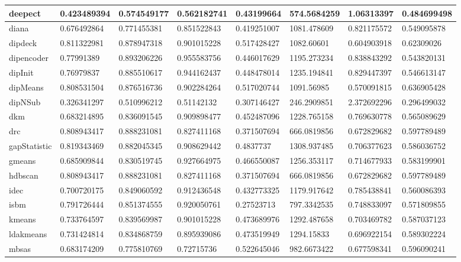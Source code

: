 \begin{table}[H]
\begin{tabular}{|l|l|l|l|l|l|l|l|}
\hline
deepect & 0.423489394 & 0.574549177 & 0.562182741 & 0.43199664 & 574.5684259 & 1.06313397 & 0.484699498 \\
\hline
diana & 0.676492864 & 0.771455381 & 0.851522843 & 0.419251007 & 1081.478609 & 0.821175572 & 0.549095878 \\
\hline
dipdeck & 0.811322981 & 0.878947318 & 0.901015228 & 0.517428427 & 1082.60601 & 0.604903918 & 0.62309026 \\
\hline
dipencoder & 0.77991389 & 0.893206226 & 0.955583756 & 0.446017629 & 1195.273234 & 0.838843292 & 0.543820131 \\
\hline
dipInit & 0.76979837 & 0.885510617 & 0.944162437 & 0.448478014 & 1235.194841 & 0.829447397 & 0.546613147 \\
\hline
dipMeans & 0.808531504 & 0.876516736 & 0.902284264 & 0.517020744 & 1091.56985 & 0.570091815 & 0.636905428 \\
\hline
dipNSub & 0.326341297 & 0.510996212 & 0.51142132 & 0.307146427 & 246.2909851 & 2.372692296 & 0.296499032 \\
\hline
dkm & 0.683214895 & 0.836091545 & 0.909898477 & 0.452487096 & 1228.765158 & 0.769630778 & 0.565089629 \\
\hline
drc & 0.808943417 & 0.888231081 & 0.827411168 & 0.371507694 & 666.0819856 & 0.672829682 & 0.597789489 \\
\hline
gapStatistic & 0.819343469 & 0.882045345 & 0.908629442 & 0.4837737 & 1308.937485 & 0.706377623 & 0.586036752 \\
\hline
gmeans & 0.685909844 & 0.830519745 & 0.927664975 & 0.466550087 & 1256.353117 & 0.714677933 & 0.583199901 \\
\hline
hdbscan & 0.808943417 & 0.888231081 & 0.827411168 & 0.371507694 & 666.0819856 & 0.672829682 & 0.597789489 \\
\hline
idec & 0.700720175 & 0.849060592 & 0.912436548 & 0.432773325 & 1179.917642 & 0.785438841 & 0.560086393 \\
\hline
isbm & 0.791726444 & 0.851374555 & 0.920050761 & 0.27523713 & 797.3342535 & 0.748833097 & 0.571809855 \\
\hline
kmeans & 0.733764597 & 0.839569987 & 0.901015228 & 0.473689976 & 1292.487658 & 0.703469782 & 0.587037123 \\
\hline
ldakmeans & 0.731424814 & 0.834868759 & 0.895939086 & 0.473519949 & 1294.15833 & 0.696922154 & 0.589302224 \\
\hline
mbsas & 0.683174209 & 0.775810769 & 0.72715736 & 0.522645046 & 982.6673422 & 0.677598341 & 0.596090241 \\

\end{tabular}
\end{table}
